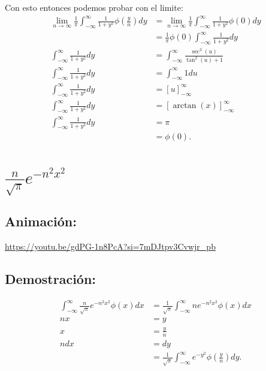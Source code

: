 \documentclass{report}   
\begin{document}
Con esto entonces podemos probar con el limite:
\begin{align*}
  \lim_{n \to \infty} \frac{1}{\pi}\int_{-\infty}^{\infty} \frac{1}{1 + y^2}\phi\left( \frac{y}{n} \right) dy&= \lim_{n \to \infty} \frac{1}{\pi}\int_{-\infty}^{\infty} \frac{1}{1 + y^2}\phi\left( 0 \right) dy \\
  &= \frac{1}{\pi}\phi\left( 0 \right) \int_{-\infty}^{\infty}\frac{1}{1 + y^2}dy \\
  \int_{-\infty}^{\infty} \frac{1}{1 + y^2}dy &= \int_{-\infty}^{\infty} \frac{\sec^2\left( u \right) }{\tan^2\left( u \right) + 1} \\
  \int_{-\infty}^{\infty} \frac{1}{1 + y^2}dy &= \int_{-\infty}^{\infty} 1 du \\
  \int_{-\infty}^{\infty} \frac{1}{1 + y^2}dy &= \left[ u \right]_{-\infty}^{\infty} \\
  \int_{-\infty}^{\infty} \frac{1}{1 + y^2}dy &= \left[ \arctan\left( x \right)  \right]_{-\infty}^{\infty} \\
  \int_{-\infty}^{\infty} \frac{1}{1 + y^2}dy &= \pi \\
  &= \phi\left( 0 \right)
.\end{align*}

\section{$\frac{n}{\sqrt{\pi} }e^{-n^2x^2}$ }

\subsection{Animación:}
\url{https://youtu.be/gdPG-1n8PcA?si=7mDJtpv3Cvwjr_pb}

\subsection{Demostración:}

\begin{align*}
  \int_{-\infty}^{\infty} \frac{n}{\sqrt{\pi} }e^{-n^2x^2}\phi\left( x \right) dx &= \frac{1}{\sqrt{\pi} } \int_{-\infty}^{\infty} n e^{-n^2x^2}\phi\left( x \right) dx \\
  nx &= y \\
  x &= \frac{y}{n} \\
  n dx &= dy \\
  &= \frac{1}{\sqrt{\pi} }\int_{-\infty}^{\infty} e^{- y^2}\phi\left( \frac{y}{n} \right) dy
.\end{align*}
\end{document}
